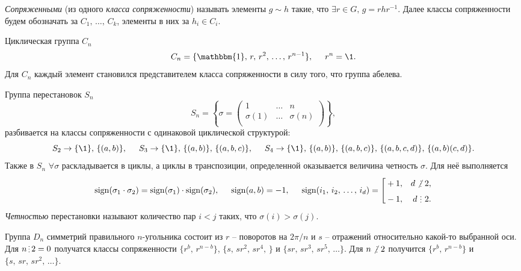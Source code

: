 
\textit{Сопряженными} (из одного  \textit{класса сопряженности}) называть элементы $g \sim h$ такие, что $\exists r \in G,\, g = r h r^{-1}$. Далее классы сопряженности будем обозначать за $C_1,\, \ldots,\, C_k$, элементы в них за $h_i \in C_i$.

Циклическая группа $C_n$
\begin{equation*}
	C_n = \{\mathbbm{1},\, r,\, r^2,\, \ldots,\, r^{n-1}\},
	\hspace{5 mm} 
	r^{n} = \1.
\end{equation*}
Для $C_n$ каждый элемент становился представителем класса сопряженности в силу того, что группа абелева.

Группа перестановок $S_n$
\begin{equation*}
	S_n = \left\{\sigma = \begin{pmatrix}
	    1 & \ldots & n  \\
	    \sigma(1) & \ldots & \sigma(n)  \\
	\end{pmatrix}\right\},
\end{equation*}
разбивается на классы сопряженности с одинаковой циклической структурой:
\begin{equation*}
	S_2 \to \{\1\},\,  \{(a, b)\},
	\hspace{5 mm} 
	S_3 \to \{\1\},\,  \{(a, b)\},\,  \{(a, b, c)\},
	\hspace{5 mm} 
	S_4 \to \{\1\},\,  \{(a, b)\},\,  \{(a, b, c)\},\,  \{(a, b, c, d)\},\,  \{(a, b) (c, d)\}.
\end{equation*}
Также в $S_n$ $\forall  \sigma$ раскладывается в циклы, а циклы в транспозиции, определенной оказывается величина четность $\sigma$. Для неё выполняется
\begin{equation*}
	\sign(\sigma_1 \cdot \sigma_2) = \sign(\sigma_1) \cdot \sign(\sigma_2),
	\hspace{5 mm} 
	\sign(a, b) = -1,
	\hspace{5 mm} 
	\sign(i_1,\, i_2,\, \ldots,\, i_d) = \left[\begin{aligned}
	    &+1, & d\not{\hspace{-1.5pt}\2}\, 2,\\
	    &-1, & d \,\2\, 2.
	\end{aligned}\right.
\end{equation*}
\textit{Четностью} перестановки называют количество пар $i < j$ таких, что $\sigma(i) > \sigma(j)$. 

Группа $D_n$ симметрий правильного $n$-угольника состоит из  $r$ -- поворотов на ${2\pi}/{n}$ и $s$ -- отражений относительно какой-то выбранной оси.
Для $n \2 2 = 0$ получатся классы сопряженности  $\{r^b,\,  r^{n-b}\}$, $\{s,\,  s r^2,\, s r^4,\, \}$ и $\{s r,\, s r^3,\, s r^5,\, \ldots\}$. Для $n \not{\hspace{-1.5pt}\2}\, 2$ получится $\{r^b,\, r^{n-b}\}$ и $\{s,\, s r,\,  sr^2,\, \ldots\}$. 


